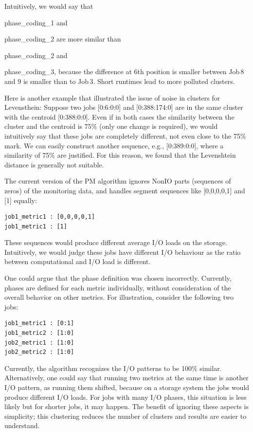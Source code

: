 \documentclass{jhps}
\begin{document}
Intuitively, we would say that {phase\_coding\_1 and{ phase\_coding\_2 are more similar than {phase\_coding\_2 and {phase\_coding\_3, because the difference at 6th position is smaller between Job\,8 and 9 is smaller than to Job\,3.
Short runtimes lead to more polluted clusters.

Here is another example that illustrated the issue of noise in clusters for Levensthein:
Suppose two jobs [0:6:0:0] and [0:388:174:0] are in the same cluster with the centroid [0:388:0:0].
Even if in both cases the similarity between the cluster and the centroid is 75$\%$  (only one change is required), we would intuitively say that these jobs are completely different, not even close to the 75$\%$  mark.
We can easily construct another sequence, e.g., [0:389:0:0], where a similarity of 75$\%$  are justified.
For this reason, we found that the Levenshtein distance is generally not suitable.

\medskip

The current version of the PM algorithm ignores NonIO parts (sequences of zeros) of the monitoring data, and  handles segment sequences like [0,0,0,0,1] and [1] equally:
\begin{lstlisting}
job1_metric1 : [0,0,0,0,1]
job1_metric1 : [1]
\end{lstlisting}

These sequences would produce different average I/O loads on the storage.
Intuitively, we would judge these jobs have different I/O behaviour as the ratio between computational and I/O load is different.

One could argue that the phase definition was chosen incorrectly.
Currently, phases are defined for each metric individually, without consideration of the overall behavior on  other metrics.
For illustration, consider the following two jobs:
\begin{lstlisting}
job1_metric1 : [0:1]
job1_metric2 : [1:0]
job2_metric1 : [1:0]
job2_metric2 : [1:0]
\end{lstlisting}

Currently, the algorithm recognizes the I/O patterns to be 100$\%$ similar.
Alternatively, one could say that running two metrics at the same time is another I/O pattern, as running them shifted, because on a storage system the jobs would produce different I/O loads.
For jobs with many I/O phases, this situation is less likely but for shorter jobs, it may happen.
The benefit of ignoring these aspects is simplicity; this clustering reduces the number of clusters and  results are easier to understand.

}}}}
\end{document}
